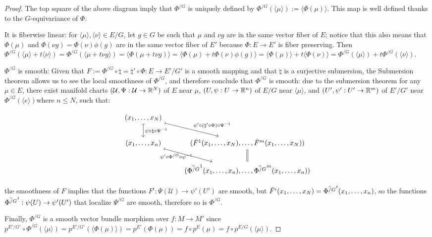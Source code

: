 \begin{proof}
The top square of the above diagram imply that $\Phi^{/G}$ is uniquely defined by $\Phi^{/G}(\langle \mu \rangle) := \langle \Phi(\mu) \rangle$. This map is well defined thanks to the $G$-equivariance of $\Phi$.

It is fiberwise linear: for $\langle \mu \rangle, \langle \nu \rangle \in E/G$, let $g \in G$ be such that $\mu$ and $\nu g$ are in the same vector fiber of $E$; notice that this also means that $\Phi(\mu)$ and $\Phi(\nu g) = \Phi(\nu) \phi(g)$ are in the same vector fiber of $E'$ because $\Phi:E \to E'$ is fiber preserving. 
Then $\Phi^{/G}(\langle \mu \rangle + t\langle \nu \rangle) = \Phi^{/G}(\langle \mu  + t \nu g \rangle)  = \langle \Phi(\mu + t \nu g ) \rangle = \langle \Phi(\mu) + t \Phi(\nu)\phi(g) \rangle = \langle \Phi(\mu) \rangle + t \langle \Phi(\nu) \rangle = \Phi^{/G}(\langle \mu \rangle) + t\Phi^{/G}(\langle \nu \rangle)$.

$\Phi^{/G}$ is smooth: Given that $F := \Phi^{/G} \circ \natural = \natural' \circ \Phi : E \to E'/G'$ is a smooth mapping and that $\natural$ is a surjective submersion, the Submersion theorem allows us to see the local smoothness of $\Phi^{/G}$, and therefore conclude that $\Phi^{/G}$ is smooth: due to the submersion theorem for any $\mu \in E$, there exist manifold charts $(\mathcal U, \Psi: \mathcal U \to \mathbb{R}^N)$ of $E$ near $\mu$, $(U, \psi: U \to \mathbb{R}^n)$ of $E/G$ near $\langle \mu \rangle$, and $(U', \psi': U' \to \mathbb{R}^m)$ of $E'/G'$ near $\Phi^{/G}(\langle e \rangle)$where $n \leq N$, such that: %

\[
\begin{tikzcd}
    (x_1, \dots, x_N) \arrow[mapsto]{rd}{\psi' \circ (\natural' \circ \Phi) \circ \Psi^{-1} } \arrow[mapsto]{d}{\psi \circ \natural \circ \Psi^{-1}} & \\
    (x_1, \dots, x_n) \arrow[mapsto]{rd}[below, near start]{\psi' \circ \Phi^{/G} \circ \psi^{-1}} & (\Tilde F^1(x_1, \dots, x_N), \dots, \Tilde F^m(x_1, \dots, x_N)) \arrow[equal]{d}\\
    & (\Tilde{\Phi^{/G}}^1(x_1, \dots, x_n), \dots, \Tilde{\Phi^{/G}}^m(x_1, \dots, x_n))
\end{tikzcd}
\]

the smoothness of $F$ implies that the functions $F^i:\Psi(\mathcal U) \to \psi'(U')$ are smooth, but $\Tilde F^i(x_1, \dots, x_N) = \Tilde{\Phi^{/G}}^i(x_1, \dots, x_n)$, so the functions $\Tilde{\Phi^{/G}}^i:\psi(U) \to \psi'(U')$ that localize $\Psi^{/G}$ are smooth, therefore so is $\Phi^{/G}$. 

Finally, $\Phi^{/G}$ is a smooth vector bundle morphism over $f:M \to M'$ since $p^{E'/G'} \circ \Phi^{/G}(\langle \mu \rangle) = p^{E'/G'}(\langle \Phi(\mu) \rangle) = p^{E'}(\Phi(\mu)) = f \circ p^E (\mu) = f \circ p^{E/G} (\langle \mu \rangle)$.

\end{proof}

